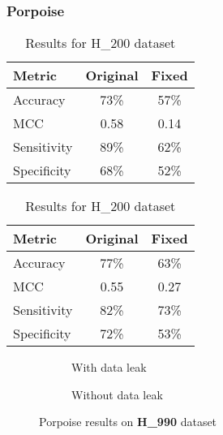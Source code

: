     \subsubsection{Porpoise \cite{li_porpoise_2021}}
      \noindent
      \begin{table}[H]
        \centering
        \begin{minipage}{0.45\textwidth}
          \centering
          \begin{tabular}{lcc}
            \toprule
            \textbf{Metric} & \textbf{Original} & \textbf{Fixed} \\
            \midrule
            Accuracy        & 73\%              & 57\%           \\
            MCC             & 0.58              & 0.14           \\
            Sensitivity     & 89\%              & 62\%           \\
            Specificity     & 68\%              & 52\%           \\
            \bottomrule
          \end{tabular}
          \caption{Results for H\_990 dataset}
        \end{minipage}%
        \hfill
        \begin{minipage}{0.45\textwidth}
          \centering
          \begin{tabular}{lcc}
            \toprule
            \textbf{Metric} & \textbf{Original} & \textbf{Fixed} \\
            \midrule
            Accuracy        & 77\%              & 63\%           \\
            MCC             & 0.55              & 0.27           \\
            Sensitivity     & 82\%              & 73\%           \\
            Specificity     & 72\%              & 53\%           \\
            \bottomrule
          \end{tabular}
          \caption{Results for H\_200 dataset}
        \end{minipage}\label{tab:porpoise_pstnpss_hs}
      \end{table}

      \begin{figure}[H]
        \centering
        \begin{subfigure}{0.47\textwidth}
          \centering
          \resizebox{\textwidth}{!}{}
          \captionsetup{justification=centering}
          \caption{With data leak}
        \end{subfigure}%
        \hspace{0.05\textwidth}
        \begin{subfigure}{0.47\textwidth}
          \centering
          \resizebox{\textwidth}{!}{}
          \captionsetup{justification=centering}
          \caption{Without data leak}
        \end{subfigure}
        \caption{Porpoise results on \textbf{H\_990} dataset}\label{fig:porpoise_h990}
      \end{figure}

